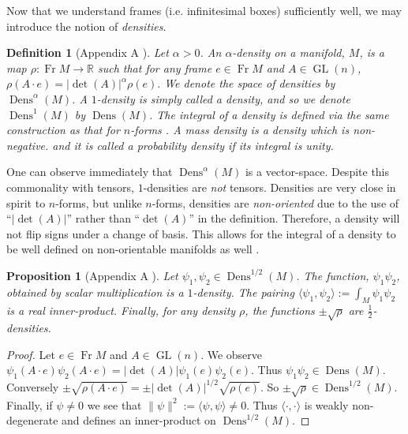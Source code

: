 \documentclass[letterpaper, 12 pt]{amsart}
\newcommand{\R}{\mathbb{R}}
\newtheorem{defn}[thm]{Definition}
\newtheorem{prop}[thm]{Proposition}
\DeclareMathOperator{\Fr}{Fr}
\DeclareMathOperator{\GL}{GL}
\DeclareMathOperator{\Dens}{Dens}
\begin{document}
  Now that we understand frames (i.e. infinitesimal boxes)
  sufficiently well, we may introduce the notion of \emph{densities}.

  \begin{defn}[Appendix A \cite{BatesWeinstein1997}]
    \label{eq:density}
    Let $\alpha > 0$.
    An $\alpha$-\emph{density} on a manifold, $M$, is a map
    $\rho:\Fr M \to \R$ such that
    for any frame $e \in \Fr M$ and $A \in \GL(n)$,
    $
      \rho( A \cdot e ) =  | \det(A) |^\alpha \rho(e).
    $
    We denote the space of densities by $\Dens^\alpha(M)$.
    A $1$-density is simply called a \emph{density}, and
    so we denote $\Dens^1(M)$ by $\Dens(M)$.
    The integral of a density is defined via the same construction as that
    for $n$-forms \cite[Ch. 14]{Lee2006}.
    A \emph{mass density} is a density which is non-negative.
    and it is called a \emph{probability density} if its integral is
    unity.
  \end{defn}

  One can observe immediately that $\Dens^\alpha(M)$ is a vector-space.
  Despite this commonality with tensors,
  $1$-densities are \emph{not} tensors.
  Densities are very close in spirit to $n$-forms,
  but unlike $n$-forms, densities are \emph{non-oriented}
  due to the use of ``$|\det(A)|$'' rather than ``$\det(A)$'' 
  in the definition.
  Therefore, a density will not flip signs under a change of basis.
  This allows for the integral of a density to be well defined
  on non-orientable manifolds as well \cite[Ch. 14]{Lee2006}.

  \begin{prop}[Appendix A \cite{BatesWeinstein1997}]
    Let $\psi_1,\psi_2 \in \Dens^{1/2}(M)$.
    The function, $\psi_1 \psi_2$, obtained by
    scalar multiplication is a $1$-density.
    The pairing
    $
    \langle \psi_1, \psi_2 \rangle := \int_M \psi_1 \psi_2 
    $
    is a real inner-product.
    Finally, for any density $\rho$, the functions $\pm\sqrt{\rho}$ are
    $\frac{1}{2}$-densities.
  \end{prop}
  \begin{proof}
    Let $e \in \Fr M$ and $A \in \GL(n)$.
    We observe $\psi_1(A \cdot e) \psi_2(A \cdot e) = |\det(A) | \psi_1(e) \psi_2(e)$.  Thus $\psi_1 \psi_2 \in \Dens(M)$.
    Conversely $\pm \sqrt{\rho( A \cdot e)} = \pm | \det(A) |^{1/2} \sqrt{ \rho(e)}$. So $\pm \sqrt{\rho} \in \Dens^{1/2}(M)$.
    Finally, if $\psi \neq 0$ we see that $\| \psi \|^2 := \langle \psi , \psi \rangle \neq 0$.
    Thus $\langle \cdot , \cdot \rangle$ is weakly non-degenerate
    and defines an inner-product on $\Dens^{1/2}(M)$.
  \end{proof}
\end{document}
